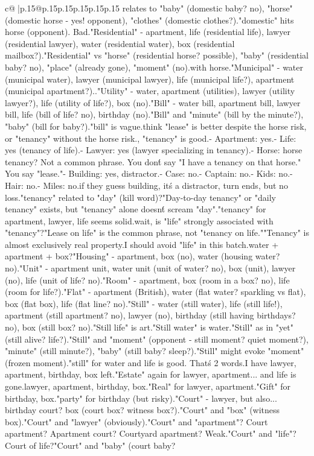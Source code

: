 \documentclass{article}
\begin{document}
{\begin{supertabular}{c@{$\;$}|p{.15\linewidth}@{}p{.15\linewidth}p{.15\linewidth}p{.15\linewidth}p{.15\linewidth}p{.15\linewidth}}
{{{relates to "baby" (domestic baby? no), "horse" (domestic horse - yes! opponent), "clothes" (domestic clothes?).\nSo "domestic" hits horse (opponent). Bad.\n\n"Residential" - apartment, life (residential life), lawyer (residential lawyer), water (residential water), box (residential mailbox?).\n"Residential" vs "horse" (residential horse? possible), "baby" (residential baby? no), "place" (already gone), "moment" (no).\nRisky with horse.\n\n"Municipal" - water (municipal water), lawyer (municipal lawyer), life (municipal life?), apartment (municipal apartment?).\nWeak.\n\n"Utility" - water, apartment (utilities), lawyer (utility lawyer?), life (utility of life?), box (no).\n\n"Bill" - water bill, apartment bill, lawyer bill, life (bill of life? no), birthday (no).\n"Bill" and "minute" (bill by the minute?), "baby" (bill for baby?).\nBut "bill" is vague.\n\nI think "lease" is better despite the horse risk, or "tenancy" without the horse risk.\n\nActually, "tenancy" is good.\n- Apartment: yes.\n- Life: yes (tenancy of life).\n- Lawyer: yes (lawyer specializing in tenancy).\n- Horse: horse tenancy? Not a common phrase. You don\'t say "I have a tenancy on that horse." You say "lease."\n- Building: yes, distractor.\n- Case: no.\n- Captain: no.\n- Kids: no.\n- Hair: no.\n- Miles: no.\n\nSo if they guess building, it\'s a distractor, turn ends, but no loss.\n\nIs "tenancy" related to "day" (kill word)?\n"Day-to-day tenancy" or "daily tenancy" exists, but "tenancy" alone doesn\'t scream "day".\n\nSo "tenancy" for apartment, lawyer, life seems solid.\n\nBut wait, is "life" strongly associated with "tenancy"?\n"Lease on life" is the common phrase, not "tenancy on life."\n"Tenancy" is almost exclusively real property.\n\nMaybe I should avoid "life" in this batch.\n\nGroup water + apartment + box?\n"Housing" - apartment, box (no), water (housing water? no).\n\n"Unit" - apartment unit, water unit (unit of water? no), box (unit), lawyer (no), life (unit of life? no).\n\n"Room" - apartment, box (room in a box? no), life (room for life?).\n\n"Flat" - apartment (British), water (flat water? sparkling vs flat), box (flat box), life (flat line? no).\n\n"Still" - water (still water), life (still life!), apartment (still apartment? no), lawyer (no), birthday (still having birthdays? no), box (still box? no).\n"Still life" is art.\n"Still water" is water.\n"Still" as in "yet" (still alive? life?).\n"Still" and "moment" (opponent - still moment? quiet moment?), "minute" (still minute?), "baby" (still baby? sleep?).\n"Still" might evoke "moment" (frozen moment).\n\nBut "still" for water and life is good. That\'s 2 words.\n\nThen I have lawyer, apartment, birthday, box left.\n"Estate" again for lawyer, apartment... and life is gone.\nSo lawyer, apartment, birthday, box.\n"Real" for lawyer, apartment.\n"Gift" for birthday, box.\nOr "party" for birthday (but risky).\n\n"Court" - lawyer, but also... birthday court? box (court box? witness box?).\n"Court" and "box" (witness box).\n"Court" and "lawyer" (obviously).\n"Court" and "apartment"? Court apartment? Apartment court? Courtyard apartment? Weak.\n"Court" and "life"? Court of life?\n"Court" and "baby" (court baby? }}}
\end{supertabular}}
\end{document}
